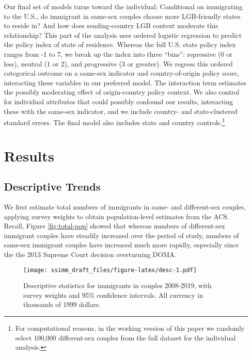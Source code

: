 \documentclass[
  11pt,
]{article}
\begin{document}
Our final set of models turns toward the individual: Conditional on immigrating to the U.S., do immigrant in same-sex couples choose more LGB-friendly states to reside in? And how does sending-country LGB context moderate this relationship? This part of the analysis uses ordered logistic regression to predict the policy index of state of residence. Whereas the full U.S. state policy index ranges from -1 to 7, we break up the index into three ``bins'': repressive (0 or less), neutral (1 or 2), and progressive (3 or greater). We regress this ordered categorical outcome on a same-sex indicator and country-of-origin policy score, interacting these variables in our preferred model. The interaction term estimates the possibly moderating effect of origin-country policy context. We also control for individual attributes that could possibly confound our results, interacting these with the same-sex indicator, and we include country- and state-clustered standard errors. The final model also includes state and country controls.\footnote{For computational reasons, in the working version of this paper we randomly select 100,000 different-sex couples from the full dataset for the individual analysis.}

\hypertarget{results}{%
\section{Results}\label{results}}

\hypertarget{descriptive-trends}{%
\subsection{Descriptive Trends}\label{descriptive-trends}}

We first estimate total numbers of immigrants in same- and different-sex couples, applying survey weights to obtain population-level estimates from the ACS. Recall, Figure \ref{fig:total-pop} showed that whereas numbers of different-sex immigrant couples have steadily increased over the period of study, numbers of same-sex immigrant couples have increased much more rapidly, especially since the the 2013 Supreme Court decision overturning DOMA.

\begin{figure}
\centering
\texttt{[image: ssimm\_draft\_files/figure-latex/desc-1.pdf]}
\caption{\label{fig:desc}Descriptive statistics for immigrants in couples 2008-2019, with survey weights and 95\% confidence intervals. All currency in thousands of 1999 dollars.}
\end{figure}
\end{document}
